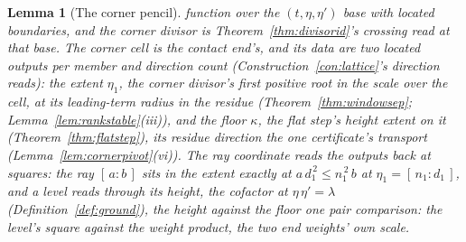 \documentclass[11pt]{article}
\newtheorem{lemma}{Lemma}
\theoremstyle{definition}
\begin{document}
\begin{lemma}[The corner pencil]
function over the $(t,\eta,\eta')$ base with located boundaries,
and the \emph{corner divisor} is Theorem~\ref{thm:divisorid}'s
crossing read at that base. The \emph{corner cell} is the contact end's,
and its data are two located outputs per member and
direction count (Construction~\ref{con:lattice}'s direction
reads): the \emph{extent} $\eta_1$, the corner divisor's first
positive root in the scale over the cell, at its leading-term
radius in the residue (Theorem~\ref{thm:windowsep};
Lemma~\ref{lem:rankstable}(iii)), and the \emph{floor} $\kappa$,
the flat step's height extent on it (Theorem~\ref{thm:flatstep}),
its residue direction the one certificate's transport
(Lemma~\ref{lem:cornerpivot}(vi)). The
ray coordinate reads the outputs back at squares: the ray
$[\,a:b\,]$ sits in the extent exactly at
$a\,d_1^{\,2}\le n_1^{\,2}\,b$ at $\eta_1=[\,n_1\!:\!d_1\,]$, and
a level reads through its height, the cofactor at
$\eta\,\eta'=\lambda$ (Definition~\ref{def:ground}), the height
against the floor one pair comparison: the level's square against
the weight product, the two end weights' own scale.


\end{lemma}
\end{document}
